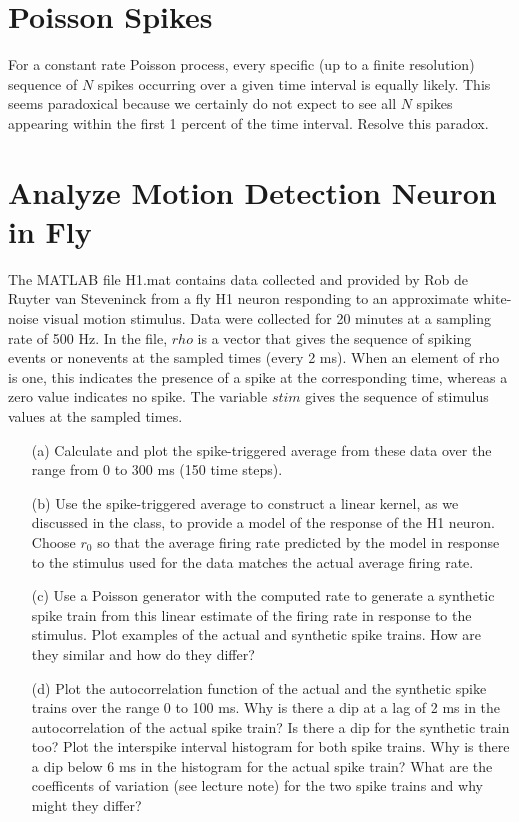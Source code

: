 \documentclass{article}
\begin{document}
\section*{Poisson Spikes}

For a constant rate Poisson process, every specific (up to a finite resolution) sequence of $N$ spikes occurring over a given time interval is equally likely. This seems paradoxical because we certainly do not expect to see all $N$ spikes appearing within the first 1 percent of the time interval. Resolve this paradox.


\section*{Analyze Motion Detection Neuron in Fly}

The MATLAB file H1.mat contains data collected and provided by Rob de Ruyter van Steveninck from a fly H1 neuron responding to an approximate white-noise visual motion stimulus. Data were collected for 20 minutes at a sampling rate of 500 Hz. In the file, $rho$ is a vector that gives the sequence of spiking events or nonevents at the sampled times (every 2 ms). When an element of rho is one, this indicates the presence of a spike at the corresponding time, whereas a zero value indicates no spike. The variable $stim$ gives the sequence of stimulus values at the sampled times. 
\begin{enumerate}
\item[(a)] Calculate and plot the spike-triggered average from these data over the range from 0 to 300 ms (150 time steps).

\item[(b)] Use the spike-triggered average to construct a linear kernel, as we discussed in the class, to provide a model of the response of the H1 neuron. Choose $r_0$ so that the average firing rate predicted by the model in response to the stimulus used
for the data matches the actual average firing rate. 

\item[(c)] Use a Poisson generator with the computed rate to generate a synthetic spike train from this linear estimate of the firing rate in response to the stimulus. Plot examples of the actual and synthetic spike trains. How
are they similar and how do they differ? 

\item[(d)]Plot the autocorrelation function of the actual and the synthetic spike trains over the range 0 to 100 ms. Why is there a dip at a lag of 2 ms in the autocorrelation of the actual spike train? Is there a dip for the synthetic train too? Plot the interspike interval histogram for both spike trains. Why is there a dip below 6 ms in the histogram for the actual spike train? What are the coefficents of variation (see lecture note) for the two spike trains and why might they differ? 

\end{enumerate}
\end{document}
